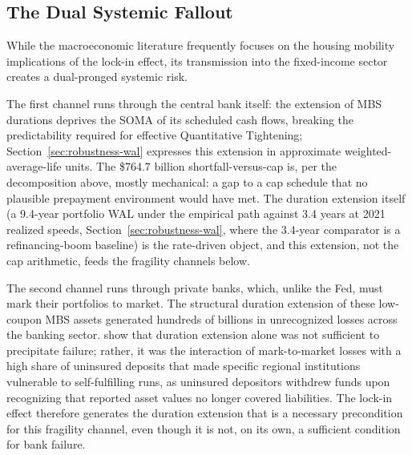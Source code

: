 \documentclass[12pt]{article}
\begin{document}
\subsection{The Dual Systemic Fallout}\label{sec:discussion-fallout}

While the macroeconomic literature frequently focuses on the housing mobility implications of the lock-in effect, its transmission into the fixed-income sector creates a dual-pronged systemic risk.

The first channel runs through the central bank itself: the extension of MBS durations deprives the SOMA of its scheduled cash flows, breaking the predictability required for effective Quantitative Tightening; Section~\ref{sec:robustness-wal} expresses this extension in approximate weighted-average-life units. The \$764.7 billion shortfall-versus-cap is, per the decomposition above, mostly mechanical: a gap to a cap schedule that no plausible prepayment environment would have met. The duration extension itself (a 9.4-year portfolio WAL under the empirical path against 3.4 years at 2021 realized speeds, Section~\ref{sec:robustness-wal}, where the 3.4-year comparator is a refinancing-boom baseline) is the rate-driven object, and this extension, not the cap arithmetic, feeds the fragility channels below.

The second channel runs through private banks, which, unlike the Fed, must mark their portfolios to market. The structural duration extension of these low-coupon MBS assets generated hundreds of billions in unrecognized losses across the banking sector. \citet{jiang2023} show that duration extension alone was not sufficient to precipitate failure; rather, it was the interaction of mark-to-market losses with a high share of uninsured deposits that made specific regional institutions vulnerable to self-fulfilling runs, as uninsured depositors withdrew funds upon recognizing that reported asset values no longer covered liabilities. The lock-in effect therefore generates the duration extension that is a necessary precondition for this fragility channel, even though it is not, on its own, a sufficient condition for bank failure.
\end{document}

